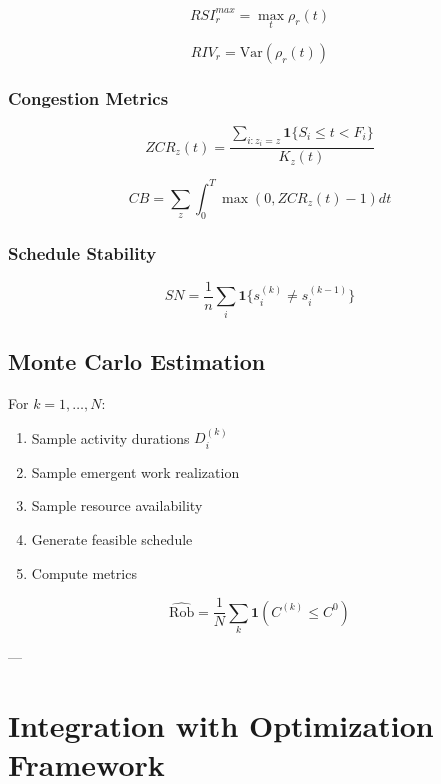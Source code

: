 \begin{equation}
RSI_r^{max} = \max_t \rho_r(t)
\end{equation}

\begin{equation}
RIV_r = \mathrm{Var}(\rho_r(t))
\end{equation}

\subsubsection{Congestion Metrics}

\begin{equation}
ZCR_z(t) = \frac{\sum_{i:z_i=z} \mathbf{1}\{S_i \le t < F_i\}}{K_z(t)}
\end{equation}

\begin{equation}
CB = \sum_z \int_0^T \max(0, ZCR_z(t) - 1) dt
\end{equation}

\subsubsection{Schedule Stability}

\begin{equation}
SN = \frac{1}{n} \sum_i \mathbf{1}\{s_i^{(k)} \neq s_i^{(k-1)}\}
\end{equation}

\subsection{Monte Carlo Estimation}

For $k = 1,\dots,N$:
\begin{enumerate}
\item Sample activity durations $D_i^{(k)}$
\item Sample emergent work realization
\item Sample resource availability
\item Generate feasible schedule
\item Compute metrics
\end{enumerate}

\begin{equation}
\widehat{\mathrm{Rob}} = \frac{1}{N} \sum_k \mathbf{1}(C^{(k)} \le C^0)
\end{equation}

---

\section{Integration with Optimization Framework}

